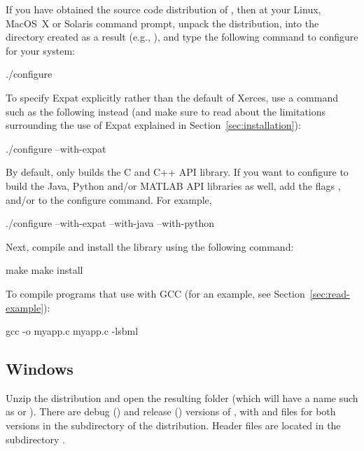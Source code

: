 \documentclass{sbmlmanual}
\begin{document}
If you have obtained the source code distribution of \libsbml{}, then at
your Linux, MacOS~X or Solaris command prompt, unpack the distribution,
 into the directory created as a result (e.g.,
), and type the following command to configure
\libsbml{} for your system:

\begin{example}[csh]
  ./configure
\end{example}

To specify Expat explicitly rather than the \libsbml{} default of Xerces,
use a command such as the following instead (and make sure to read about
the limitations surrounding the use of Expat explained in
Section~\ref{sec:installation}):

\begin{example}[csh]
  ./configure --with-expat
\end{example}

By default, \libsbml{} only builds the C and C++ API library.  If you want
to configure \libsbml{} to build the Java, Python and/or MATLAB API
libraries as well, add the flags , 
and/or  to the configure command.  For example,

\begin{example}[csh]
  ./configure --with-expat --with-java --with-python
\end{example}

Next, compile and install the \libsbml{} library using the following command:

\begin{example}[csh]
  make
  make install
\end{example}

To compile programs that use \libsbml{} with GCC (for an example, see
Section~\ref{sec:read-example}):

\begin{example}[csh]
  gcc -o myapp.c myapp.c -lsbml
\end{example}


\subsection{Windows}

Unzip the \libsbml{} distribution and open the resulting folder (which will
have a name such as  or
).  There are debug () and
release () versions of \libsbml{}, with  and
 files for both versions in the  subdirectory of
the \libsbml{} distribution.  Header files are located in the subdirectory
.
\end{document}

